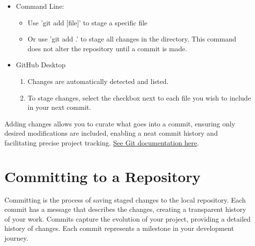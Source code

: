 \documentclass[10pt,twocolumn]{article}
\begin{document}
\begin{itemize}
    \item Command Line: 
    \begin{itemize}
        \item  Use 'git add [file]' to stage a specific file 
        \item Or use 'git add .' to stage all changes in the directory. This command does not alter the repository until a commit is made.
    \end{itemize}
    \item GitHub Desktop
    \begin{enumerate}
        \item Changes are automatically detected and listed.
        \item To stage changes, select the checkbox next to each file you wish to include in your next commit.
    \end{enumerate}
    
\end{itemize}


Adding changes allows you to curate what goes into a commit, ensuring only desired modifications are included, enabling a neat commit history and facilitating precise project tracking. \hyperlink{https://git-scm.com/docs/git-add}{See Git documentation here}. \cite{GitAddDocumentation}\cite{GitGuidesAdd}

\section{Committing to a Repository}
Committing is the process of saving staged changes to the local repository. Each commit has a message that describes the changes, creating a transparent history of your work.
Commits capture the evolution of your project, providing a detailed history of changes. Each commit represents a milestone in your development journey.
\end{document}
